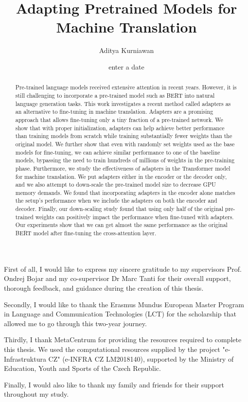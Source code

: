 \documentclass[12pt, a4paper]{report}
\theoremstyle{definition}
\theoremstyle{definition}%
\theoremstyle{definition}%
\theoremstyle{definition}%
\theoremstyle{definition}%
\theoremstyle{definition}%
\begin{document}
\title{Adapting Pretrained Models for Machine Translation}
\author{Aditya Kurniawan}
\date{enter a date}

\frontmatter


\begin{acknowledgements}
    First of all, I would like to express my sincere gratitude to my supervisors Prof. Ondrej Bojar and my co-supervisor Dr Marc Tanti for their overall support, thorough feedback, and guidance during the creation of this thesis.

    Secondly, I would like to thank the Erasmus Mundus European Master Program in Language and Communication Technologies (LCT) for the scholarship that allowed me to go through this two-year journey.

    Thirdly, I thank MetaCentrum for providing the resources required to complete this thesis. We used the computational resources supplied by the project "e-Infrastruktura CZ" (e-INFRA CZ LM2018140), supported by the Ministry of Education, Youth and Sports of the Czech Republic.

    Finally, I would also like to thank my family and friends for their support throughout my study.
\end{acknowledgements}

\begin{abstract}
    Pre-trained language models received extensive attention in recent years. However, it is still challenging to incorporate a pre-trained model such as BERT into natural language generation tasks. This work investigates a recent method called adapters as an alternative to fine-tuning in machine translation. Adapters are a promising approach that allows fine-tuning only a tiny fraction of a pre-trained network.
    We show that with proper initialization, adapters can help achieve better performance than training models from scratch while training substantially fewer weights than the original model.
    We further show that even with randomly set weights used as the base models for fine-tuning, we can achieve similar performance to one of the baseline models, bypassing the need to train hundreds of millions of weights in the pre-training phase.
    Furthermore, we study the effectiveness of adapters in the Transformer model for machine translation. We put adapters either in the encoder or the decoder only, and we also attempt to down-scale the pre-trained model size to decrease GPU memory demands.
    We found that incorporating adapters in the encoder alone matches the setup's performance when we include the adapters on both the encoder and decoder.
    Finally, our down-scaling study found that using only half of the original pre-trained weights can positively impact the performance when fine-tuned with adapters. Our experiments show that we can get almost the same performance as the original BERT model after fine-tuning the cross-attention layer.
\end{abstract}
\end{document}
